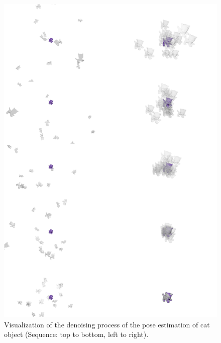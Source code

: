 \documentclass[12pt,DIV14,BCOR12mm,a4paper,footinclude=false,headinclude,parskip=half-,twoside,openright,cleardoublepage=empty,toc=index,bibliography=totoc,listof=totoc]{scrreprt}
\numberwithin{equation}{chapter}
\begin{document}
\begin{figure}[H]
	\centering
	\includegraphics[width=1.\textwidth]{img/vis_cat.pdf}
	\caption{Visualization of the denoising process of the pose estimation of cat object (Sequence: top to bottom, left to right).}
	\label{img:vis_cat}
\end{figure}
\end{document}
